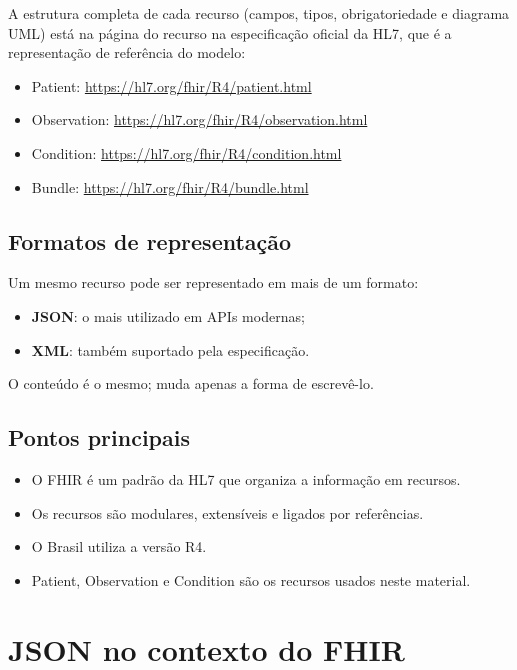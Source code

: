 \documentclass[11pt,a4paper]{article}
\begin{document}
A estrutura completa de cada recurso (campos, tipos, obrigatoriedade e
diagrama UML) está na página do recurso na especificação oficial da HL7,
que é a representação de referência do modelo:

\begin{itemize}
  \item Patient: \url{https://hl7.org/fhir/R4/patient.html}
  \item Observation: \url{https://hl7.org/fhir/R4/observation.html}
  \item Condition: \url{https://hl7.org/fhir/R4/condition.html}
  \item Bundle: \url{https://hl7.org/fhir/R4/bundle.html}
\end{itemize}

\subsection{Formatos de representação}

Um mesmo recurso pode ser representado em mais de um formato:

\begin{itemize}
  \item \textbf{JSON}: o mais utilizado em APIs modernas;
  \item \textbf{XML}: também suportado pela especificação.
\end{itemize}

O conteúdo é o mesmo; muda apenas a forma de escrevê-lo.

\subsection*{Pontos principais}

\begin{itemize}
  \item O FHIR é um padrão da HL7 que organiza a informação em recursos.
  \item Os recursos são modulares, extensíveis e ligados por referências.
  \item O Brasil utiliza a versão R4.
  \item Patient, Observation e Condition são os recursos usados neste
    material.
\end{itemize}

\section{JSON no contexto do FHIR}
\end{document}

